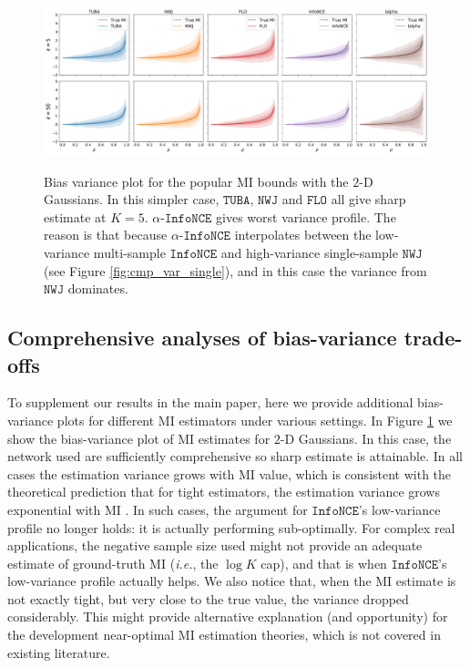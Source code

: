 \documentclass{article}
\theoremstyle{plain}
\theoremstyle{definition}
\theoremstyle{remark}
\newcommand{\infonce}{\texttt{InfoNCE}}
\newcommand{\TUBA}{\texttt{TUBA}}
\newcommand{\NWJ}{\texttt{NWJ}}
\newcommand{\FLO}{\texttt{FLO}}
\begin{document}
		
		\begin{figure}[t!]
			\begin{center}
				\includegraphics[height=2in]{figures/toy/1dmultisample_bounds.pdf}
			\end{center}
			\vspace{-1.5em}
			\caption{Bias variance plot for the popular MI bounds with the $2$-D Gaussians. In this simpler case, $\TUBA$, $\NWJ$ and $\FLO$ all give sharp estimate at $K=5$. $\alpha$-$\infonce$ gives worst variance profile. The reason is that because $\alpha$-$\infonce$ interpolates between the low-variance multi-sample $\infonce$ and high-variance single-sample $\NWJ$ (see Figure \ref{fig:cmp_var_single}), and in this case the variance from $\NWJ$ dominates.  \label{fig:cmp_var_1d_cubic}}
			\vspace{-1.em}
		\end{figure}
		
		
		
		\subsection{Comprehensive analyses of bias-variance trade-offs}
		
		To supplement our results in the main paper, here we provide additional bias-variance plots for different MI estimators under various settings. In Figure \ref{fig:cmp_var_1d_cubic} we show the bias-variance plot of MI estimates for $2$-D Gaussians. In this case, the network used are sufficiently comprehensive so sharp estimate is attainable. In all cases the estimation variance grows with MI value, which is consistent with the theoretical prediction that for tight estimators, the estimation variance grows exponential with MI \citep{mcallester2018formal}. In such cases, the argument for $\infonce$'s low-variance profile no longer holds: it is actually performing sub-optimally. For complex real applications, the negative sample size used might not provide an adequate estimate of ground-truth MI ({\it i.e.}, the $\log K$ cap), and that is when $\infonce$'s low-variance profile actually helps. We also notice that, when the MI estimate is not exactly tight, but very close to the true value, the variance dropped considerably. This might provide alternative explanation (and opportunity) for the development near-optimal MI estimation theories, which is not covered in existing literature.  
		
\end{document}
